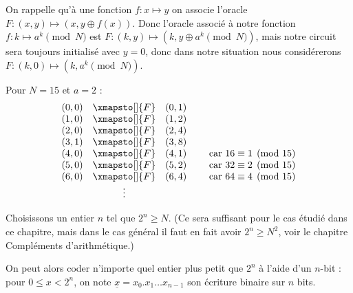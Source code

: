 \documentclass[11pt,class=report,crop=false]{standalone}
\begin{document}
On rappelle qu'à une fonction $f : x \mapsto y$ on associe l'oracle $F : (x,y) \mapsto (x, y \oplus f(x))$. Donc l'oracle associé à notre fonction $f : k \mapsto a^k \pmod N$ est
$F : (k,y) \mapsto (k, y \oplus a^k \pmod N)$, mais notre circuit sera toujours initialisé avec $y=0$, donc dans notre situation nous considérerons $F : (k,0) \mapsto (k, a^k \pmod N)$.



\begin{exemple}
Pour $N=15$ et $a=2$ :
$$\begin{array}{rcl}
(0,0) & \xmapsto[]{F}& (0,1) \\
(1,0) & \xmapsto[]{F}& (1,2) \\
(2,0) & \xmapsto[]{F}& (2,4) \\
(3,1) & \xmapsto[]{F}& (3,8) \\
(4,0) & \xmapsto[]{F}& (4,1) \qquad \text{ car } 16 \equiv 1 \pmod{15} \\
(5,0) & \xmapsto[]{F}& (5,2) \qquad \text{ car } 32 \equiv 2 \pmod{15} \\
(6,0) & \xmapsto[]{F}& (6,4) \qquad \text{ car } 64 \equiv 4 \pmod{15} \\
& \vdots  & \\
\end{array}$$
\end{exemple}


Choisissons un entier $n$ tel que $2^n \ge N$. (Ce sera suffisant pour le cas étudié dans ce chapitre, mais dans le cas général il faut en fait avoir $2^n \ge N^2$, voir le chapitre \og{}Compléments d'arithmétique\fg{}.) 


On peut alors coder n'importe quel entier plus petit que $2^n$ à l'aide d'un  $n$-bit :
pour $0 \le x < 2^n$, on note $\underline{x} = x_0.x_1 \ldots x_{n-1}$ son écriture binaire sur $n$ bits.
\end{document}
